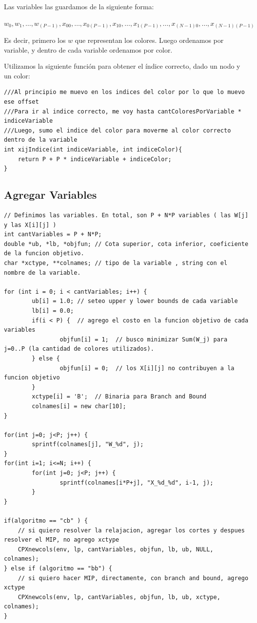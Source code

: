 \documentclass[a4paper, 10pt, twoside]{article}
\begin{document}
Las variables las guardamos de la siguiente forma:
\begin{center}
$w_0, w_1, \ldots, w_{(P-1)}, x_{00}, \ldots, x_{0(P-1)}, x_{10}, \ldots, x_{1(P-1)}, \ldots, x_{(N-1)0},\ldots, x_{(N-1)(P-1)}$
\end{center}

Es decir, primero los $w$ que representan los colores. Luego ordenamos por variable, y dentro de cada variable ordenamos por color.

Utilizamos la siguiente función para obtener el índice correcto, dado un nodo y un color:

\begin{lstlisting}
///Al principio me muevo en los indices del color por lo que lo muevo ese offset
///Para ir al indice correcto, me voy hasta cantColoresPorVariable * indiceVariable
///Luego, sumo el indice del color para moverme al color correcto dentro de la variable
int xijIndice(int indiceVariable, int indiceColor){
    return P + P * indiceVariable + indiceColor;
}
\end{lstlisting}


\subsection{Agregar Variables}

\begin{lstlisting}
// Definimos las variables. En total, son P + N*P variables ( las W[j] y las X[i][j] )
int cantVariables = P + N*P;
double *ub, *lb, *objfun; // Cota superior, cota inferior, coeficiente de la funcion objetivo.
char *xctype, **colnames; // tipo de la variable , string con el nombre de la variable.

for (int i = 0; i < cantVariables; i++) {
		ub[i] = 1.0; // seteo upper y lower bounds de cada variable
		lb[i] = 0.0;
		if(i < P) {  // agrego el costo en la funcion objetivo de cada variables
				objfun[i] = 1;  // busco minimizar Sum(W_j) para j=0..P (la cantidad de colores utilizados).
		} else {
				objfun[i] = 0;  // los X[i][j] no contribuyen a la funcion objetivo
		}
		xctype[i] = 'B';  // Binaria para Branch and Bound
		colnames[i] = new char[10];
}

for(int j=0; j<P; j++) {
		sprintf(colnames[j], "W_%d", j);
}
for(int i=1; i<=N; i++) {
		for(int j=0; j<P; j++) {
				sprintf(colnames[i*P+j], "X_%d_%d", i-1, j);
		}
}

if(algoritmo == "cb" ) {
	// si quiero resolver la relajacion, agregar los cortes y despues resolver el MIP, no agrego xctype
	CPXnewcols(env, lp, cantVariables, objfun, lb, ub, NULL, colnames);
} else if (algoritmo == "bb") {
	// si quiero hacer MIP, directamente, con branch and bound, agrego xctype
	CPXnewcols(env, lp, cantVariables, objfun, lb, ub, xctype, colnames);
}
\end{lstlisting}
\end{document}
